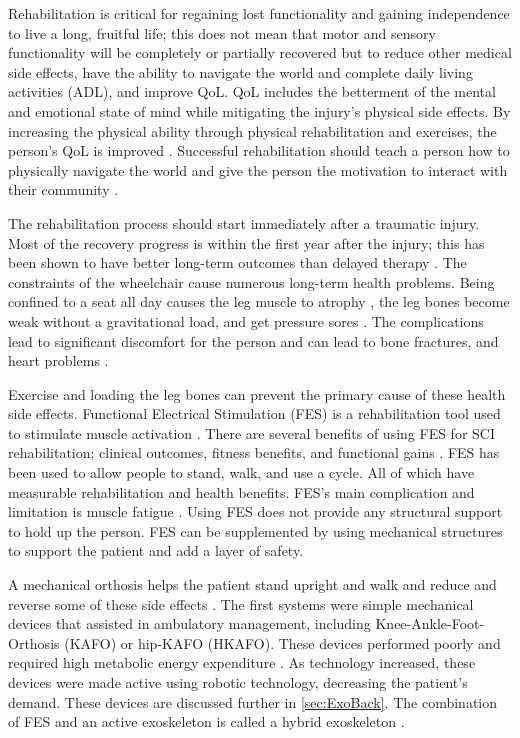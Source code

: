  Rehabilitation is critical for regaining lost functionality and gaining independence to live a long, fruitful life; this does not mean that motor and sensory functionality will be completely or partially recovered but to reduce other medical side effects, have the ability to navigate the world and complete daily living activities (ADL), and improve QoL. QoL includes the betterment of the mental and emotional state of mind while mitigating the injury's physical side effects. By increasing the physical ability through physical rehabilitation and exercises, the person's QoL is improved \cite{noreau1995spinal}. Successful rehabilitation should teach a person how to physically navigate the world and give the person the motivation to interact with their community \cite{hammell2013spinal}.
 
 
 The rehabilitation process should start immediately after a traumatic injury. Most of the recovery progress is within the first year after the injury; this has been shown to have better long-term outcomes than delayed therapy \cite{scivoletto2005early} \cite{piepmeier1988late}. The constraints of the wheelchair cause numerous long-term health problems. Being confined to a seat all day causes the leg muscle to atrophy \cite{castro1999influence}, the leg bones become weak \cite{goemaere1994bone} without a gravitational load, and get pressure sores \cite{wall2000preventing}. The complications lead to significant discomfort for the person and can lead to bone fractures, and heart problems \cite{giangregorio2006bone}.  
 
 Exercise and loading the leg bones can prevent the primary cause of these health side effects. Functional Electrical Stimulation (FES) is a rehabilitation tool used to stimulate muscle activation  \cite{quintero2012preliminary}. There are several benefits of using FES for SCI rehabilitation; clinical outcomes, fitness benefits, and functional gains \cite{hamid2008role}. FES has been used to allow people to stand, walk, and use a cycle\cite{mazzoleni2013fes}. All of which have measurable rehabilitation and health benefits. FES's main complication and limitation is muscle fatigue \cite{karu1995reducing}. Using FES  does not provide any structural support to hold up the person. FES can be supplemented by using mechanical structures to support the patient and add a layer of safety. 
 
A mechanical orthosis helps the patient stand upright and walk and reduce and reverse some of these side effects \cite{palermo2017clinician}. The first systems were simple mechanical devices that assisted in ambulatory management, including Knee-Ankle-Foot-Orthosis (KAFO) or hip-KAFO (HKAFO). These devices performed poorly and required high metabolic energy expenditure \cite{del2012review}. As technology increased, these devices were made active using robotic technology, decreasing the patient's demand. These devices are discussed further in \autoref{sec:ExoBack}. The combination of FES and an active exoskeleton is called a hybrid exoskeleton \cite{ha2012enhancing} \cite{alouane2019hybrid}. 

